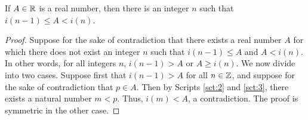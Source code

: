 \documentclass[../main.tex]{subfiles}
\begin{document}
\begin{corollary}\label{cly:6.14}
    If $A\in\mathbb{R}$ is a real number, then there is an integer $n$ such that $i(n-1)\leq A<i(n)$.
    \begin{proof}
        Suppose for the sake of contradiction that there exists a real number $A$ for which there does not exist an integer $n$ such that $i(n-1)\leq A$ and $A<i(n)$. In other words, for all integers $n$, $i(n-1)>A$ or $A\geq i(n)$. We now divide into two cases. Suppose first that $i(n-1)>A$ for all $n\in\mathbb{Z}$, and suppose for the sake of contradiction that $p\in A$. Then by Scripts \ref{sct:2} and \ref{sct:3}, there exists a natural number $m<p$. Thus, $i(m)<A$, a contradiction. The proof is symmetric in the other case.
    \end{proof}
\end{corollary}
\end{document}
